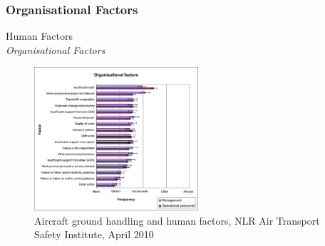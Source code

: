 \subsubsection{Organisational Factors}
\begin{frame}{Human Factors\\\textit{Organisational Factors}}{}
	\begin{figure}[H]
	\centering
	\includegraphics[width=230px]{Grafik/OrganisationalFactors}
	\caption{Aircraft ground handling and human factors, NLR Air Transport Safety Institute, April 2010}
\end{figure}
\end{frame}